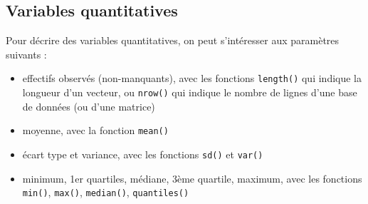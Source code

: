 \documentclass[
]{book}
\providecommand{\tightlist}{%
  \setlength{\itemsep}{0pt}\setlength{\parskip}{0pt}}
\begin{document}
\subsection{Variables quantitatives}\label{variables-quantitatives-1}

Pour décrire des variables quantitatives, on peut s'intéresser aux paramètres suivants :

\begin{itemize}
\tightlist
\item
  effectifs observés (non-manquants), avec les fonctions \texttt{length()} qui indique la longueur d'un vecteur, ou \texttt{nrow()} qui indique le nombre de lignes d'une base de données (ou d'une matrice)
\item
  moyenne, avec la fonction \texttt{mean()}
\item
  écart type et variance, avec les fonctions \texttt{sd()} et \texttt{var()}
\item
  minimum, 1er quartiles, médiane, 3ème quartile, maximum, avec les fonctions \texttt{min()}, \texttt{max()}, \texttt{median()}, \texttt{quantiles()}
\end{itemize}
\end{document}
